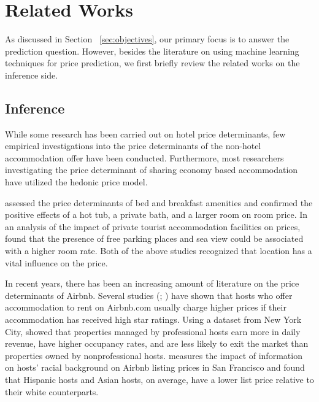 
\section{Related Works}

As discussed in Section ~\ref{sec:objectives}, our primary focus is to answer
the prediction question. However, besides the literature on using machine
learning techniques for price prediction, we first briefly review the related
works on the inference side.

\subsection{Inference}

While some research has been carried out on hotel price determinants, few
empirical investigations into the price determinants of the non-hotel
accommodation offer have been conducted.  Furthermore, most researchers
investigating the price determinant of sharing economy based accommodation have
utilized the hedonic price model.

\textcite{monty2003hedonic} assessed the price determinants of bed and breakfast
amenities and confirmed the positive effects of a hot tub, a private bath, and a
larger room on room price.  In an analysis of the impact of private tourist
accommodation facilities on prices, \textcite{portolan2013impact} found that the
presence of free parking places and sea view could be associated with a higher
room rate.  Both of the above studies recognized that location has a vital
influence on the price.

In recent years, there has been an increasing amount of literature on the price
determinants of Airbnb.  Several studies (\textcite{gutt2015sharing};
\textcite{ikkala2014defining} ) have shown that hosts who offer accommodation to
rent on Airbnb.com usually charge higher prices if their accommodation has
received high star ratings.  Using a dataset from New York City,
\textcite{li2016pros,} showed that properties managed by professional hosts earn
more in daily revenue, have higher occupancy rates, and are less likely to exit
the market than properties owned by nonprofessional hosts.
\textcite{kakar2016effects} measures the impact of information on hosts’ racial
background on Airbnb listing prices in San Francisco and found that Hispanic
hosts and Asian hosts, on average, have a lower list price relative to their
white counterparts.

